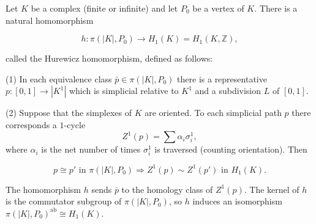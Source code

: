 Let $K$ be a complex (finite or infinite) and let $P_0$ be a vertex of $K$. There is a natural homomorphism

$$h: \pi(|K|, P_0) \to H_1(K) = H_1(K, \mathbb{Z}),$$

called the Hurewicz homomorphism, defined as follows:

(1) In each equivalence class $\bar{p} \in \pi(|K|, P_0)$ there is a representative $p: [0,1] \to |K^1|$ which is simplicial relative to $K^1$ and a subdivision $L$ of $[0,1]$.

(2) Suppose that the simplexes of $K$ are oriented. To each simplicial path $p$ there corresponds a $1$-cycle
$$Z^1(p) = \sum \alpha_i \sigma_i^1,$$
where $\alpha_i$ is the net number of times $\sigma_i^1$ is traversed (counting orientation). Then

$$p \cong p' \text{ in } \pi(|K|, P_0) \Rightarrow Z^1(p) \sim Z^1(p') \text{ in } H_1(K).$$

The homomorphism $h$ sends $\bar{p}$ to the homology class of $Z^1(p)$. The kernel of $h$ is the commutator subgroup of $\pi(|K|, P_0)$, so $h$ induces an isomorphism $\pi(|K|, P_0)^{\text{ab}} \cong H_1(K)$.
